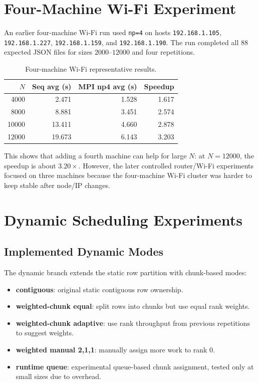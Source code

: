 \documentclass[12pt,a4paper]{article}
\begin{document}
\section{Four-Machine Wi-Fi Experiment}

An earlier four-machine Wi-Fi run used \texttt{np=4} on hosts \texttt{192.168.1.105}, \texttt{192.168.1.227}, \texttt{192.168.1.159}, and \texttt{192.168.1.190}. The run completed all 88 expected JSON files for sizes $2000$--$12000$ and four repetitions.

\begin{table}[H]
\centering
\begin{tabular}{rrrr}
\toprule
$N$ & Seq avg (s) & MPI np4 avg (s) & Speedup \\
\midrule
4000 & 2.471 & 1.528 & 1.617 \\
8000 & 8.881 & 3.451 & 2.574 \\
10000 & 13.411 & 4.660 & 2.878 \\
12000 & 19.673 & 6.143 & 3.203 \\
\bottomrule
\end{tabular}
\caption{Four-machine Wi-Fi representative results.}
\end{table}

This shows that adding a fourth machine can help for large $N$: at $N=12000$, the speedup is about $3.20\times$. However, the later controlled router/Wi-Fi experiments focused on three machines because the four-machine Wi-Fi cluster was harder to keep stable after node/IP changes.

\section{Dynamic Scheduling Experiments}

\subsection{Implemented Dynamic Modes}

The dynamic branch extends the static row partition with chunk-based modes:

\begin{itemize}
  \item \textbf{contiguous}: original static contiguous row ownership.
  \item \textbf{weighted-chunk equal}: split rows into chunks but use equal rank weights.
  \item \textbf{weighted-chunk adaptive}: use rank throughput from previous repetitions to suggest weights.
  \item \textbf{weighted manual 2,1,1}: manually assign more work to rank 0.
  \item \textbf{runtime queue}: experimental queue-based chunk assignment, tested only at small sizes due to overhead.
\end{itemize}
\end{document}
